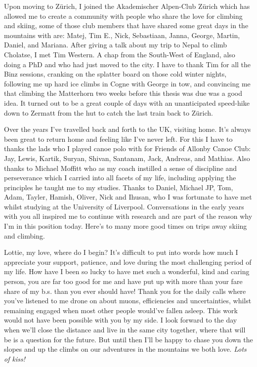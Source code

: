 \documentclass[a4paper,11pt,usegeometry]{scrreprt} %
\begin{document}
Upon moving to Z\"urich, I joined the Akademischer Alpen-Club Z\"urich which has allowed me to  create a community with people who share the love for climbing and skiing, some of those club members that have shared some great days in the mountains with are: Matej, Tim E., Nick, Sebastiaan, Janna, George, Martin, Daniel, and Mariana. After giving a talk about my trip to Nepal to climb Cholatse, I met Tim Western. A chap from the South-West of England, also doing a PhD and who had just moved to the city. I have to thank Tim for all the Binz sessions, cranking on the splatter board on those cold winter nights, following me up hard ice climbs in Cogne with George in tow, and convincing me that climbing the Matterhorn two weeks before this thesis was due was a good idea. It turned out to be a great couple of days with an unanticipated speed-hike down to Zermatt from the hut to catch the last train back to Z\"urich.

Over the years I've travelled back and forth to the UK, visiting home. It's always been great to return home and feeling like I've never left. For this I have to thanks the lads who I played canoe polo with for Friends of Allonby Canoe Club: Jay, Lewis, Kartik, Suryan, Shivan, Santanam, Jack, Andreas, and Mathias. Also thanks to Michael Moffitt who as my coach instilled a sense of discipline and perseverance which I carried into all facets of my life, including applying the principles he taught me to my studies. Thanks to Daniel, Michael JP, Tom, Adam, Tayler, Hamish, Oliver, Nick and Ihusan, who I was fortunate to have met whilst studying at the University of Liverpool. Conversations in the early years with you all inspired me to continue with research and are part of the reason why I'm in this position today. Here's to many more good times on trips away skiing and climbing.

Lottie, my love, where do I begin? It's difficult to put into words how much I appreciate your support, patience, and love during the most challenging period of my life. How have I been so lucky to have met such a wonderful, kind and caring person, you are far too good for me and have put up with more than your fare share of my b.s. than you ever should have! Thank you for the daily calls where you've listened to me drone on about muons, efficiencies and uncertainties, whilst remaining engaged when most other people would've fallen asleep. This work would not have been possible with you by my side. I look forward to the day when we'll close the distance and live in the same city together, where that will be is a question for the future. But until then I'll be happy to chase you down the slopes and up the climbs on our adventures in the mountains we both love. \textit{Lots of kiss!}
\end{document}
